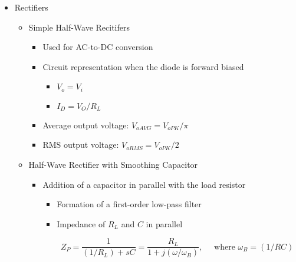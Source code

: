 \begin{itemize}

  \item Rectifiers

    \begin{itemize}

      \item Simple Half-Wave Recitifers

        \begin{itemize}

          \item Used for AC-to-DC conversion

          \item Circuit representation when the diode is forward biased

            \begin{itemize}

              \item $V_o=V_i$

              \item $I_D=V_O/R_L$

            \end{itemize}

          \item Average output voltage: $V_{oAVG}=V_{oPK}/\pi$

          \item RMS output voltage: $V_{oRMS}=V_{oPK}/2$

        \end{itemize}

      \item Half-Wave Rectifier with Smoothing Capacitor

        \begin{itemize}

          \item Addition of a capacitor in parallel with the load resistor

            \begin{itemize}

              \item Formation of a first-order low-pass filter

              \item Impedance of $R_L$ and $C$ in parallel

                $$Z_P=\frac{1}{(1/R_L)+sC}=\frac{R_L}{1+j(\omega/\omega_B)},\quad\text{ where }\omega_B=(1/RC)$$

            \end{itemize}


\end{itemize}
\end{itemize}
\end{itemize}
